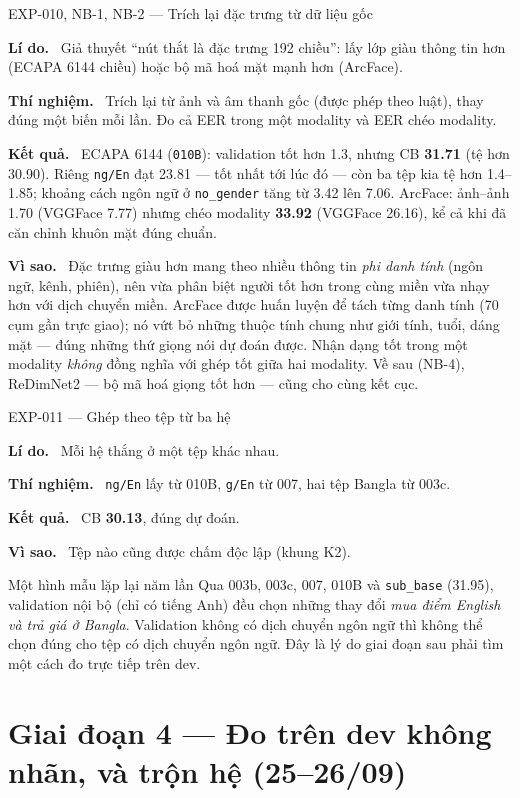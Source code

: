 \documentclass[11pt,a4paper,oneside]{report}
\newcommand{\up}[1]{\textbf{\color{good}#1}}
\newcommand{\down}[1]{\textbf{\color{bad}#1}}
\newcommand{\id}[1]{\texttt{#1}}
\newcommand{\field}[1]{\par\smallskip\textbf{\color{accent}#1.}~}
\begin{document}
\begin{expbox}{EXP-010, NB-1, NB-2 --- Trích lại đặc trưng từ dữ liệu gốc}
\field{Lí do} Giả thuyết ``nút thắt là đặc trưng 192 chiều'': lấy lớp giàu thông tin hơn (ECAPA 6144 chiều) hoặc bộ mã hoá mặt mạnh hơn (ArcFace).
\field{Thí nghiệm} Trích lại từ ảnh và âm thanh gốc (được phép theo luật), thay đúng một biến mỗi lần. Đo cả EER trong một modality và EER chéo modality.
\field{Kết quả} ECAPA 6144 (\id{010B}): validation tốt hơn 1.3, nhưng CB \down{31.71} (tệ hơn 30.90). Riêng \id{ng/En} đạt 23.81 --- tốt nhất tới lúc đó --- còn ba tệp kia tệ hơn 1.4--1.85; khoảng cách ngôn ngữ ở \id{no\_gender} tăng từ 3.42 lên 7.06. ArcFace: ảnh--ảnh 1.70 (VGGFace 7.77) nhưng chéo modality \down{33.92} (VGGFace 26.16), kể cả khi đã căn chỉnh khuôn mặt đúng chuẩn.
\field{Vì sao} Đặc trưng giàu hơn mang theo nhiều thông tin \emph{phi danh tính} (ngôn ngữ, kênh, phiên), nên vừa phân biệt người tốt hơn trong cùng miền vừa nhạy hơn với dịch chuyển miền. ArcFace được huấn luyện để tách từng danh tính (70 cụm gần trực giao); nó vứt bỏ những thuộc tính chung như giới tính, tuổi, dáng mặt --- đúng những thứ giọng nói dự đoán được. Nhận dạng tốt trong một modality \emph{không} đồng nghĩa với ghép tốt giữa hai modality. Về sau (NB-4), ReDimNet2 --- bộ mã hoá giọng tốt hơn --- cũng cho cùng kết cục.
\end{expbox}

\begin{expbox}{EXP-011 --- Ghép theo tệp từ ba hệ}
\field{Lí do} Mỗi hệ thắng ở một tệp khác nhau.
\field{Thí nghiệm} \id{ng/En} lấy từ 010B, \id{g/En} từ 007, hai tệp Bangla từ 003c.
\field{Kết quả} CB \up{30.13}, đúng dự đoán.
\field{Vì sao} Tệp nào cũng được chấm độc lập (khung K2).
\end{expbox}

\begin{warnbox}{Một hình mẫu lặp lại năm lần}
Qua 003b, 003c, 007, 010B và \id{sub\_base} (31.95), validation nội bộ (chỉ có tiếng Anh) đều chọn những thay đổi \emph{mua điểm English và trả giá ở Bangla}. Validation không có dịch chuyển ngôn ngữ thì không thể chọn đúng cho tệp có dịch chuyển ngôn ngữ. Đây là lý do giai đoạn sau phải tìm một cách đo trực tiếp trên dev.
\end{warnbox}

\section{Giai đoạn 4 --- Đo trên dev không nhãn, và trộn hệ (25--26/09)}
\label{sec:p4}
\end{document}
